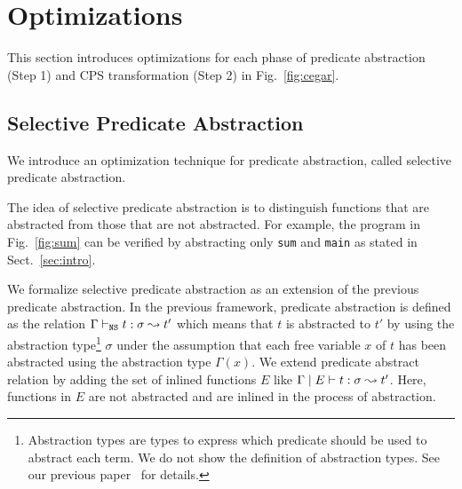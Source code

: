 
\section{Optimizations}
\label{sec:opt}

This section introduces optimizations for each phase of predicate
abstraction (Step 1) and CPS transformation (Step 2) in Fig.~\ref{fig:cegar}.

\subsection{Selective Predicate Abstraction}

We introduce an optimization technique for predicate abstraction, called
selective predicate abstraction.

The idea of selective predicate abstraction is to distinguish functions
that are abstracted from those that are not abstracted.  For
example, the program in Fig.~\ref{fig:sum} can be verified by
abstracting only \texttt{sum} and \texttt{main} as stated in
Sect.~\ref{sec:intro}.

We formalize selective predicate abstraction as an extension of the
previous predicate abstraction.  In the previous framework, predicate
abstraction is defined as the relation
${\Gamma} \vdash_{\texttt{NS}} {t} : {\sigma} \leadsto {t'}$ which means that $t$ is abstracted to $t'$
by using the abstraction type\footnote{Abstraction types are types to
express which predicate should be used to abstract each term.  We do not show
the definition of abstraction types.  See our previous
paper~\cite{KobayashiPLDI2011} for details.}  $\sigma$ under the
assumption that each free variable $x$ of $t$ has been abstracted using
the abstraction type $\Gamma(x)$.  We extend predicate abstract relation
by adding the set of inlined functions $E$ like
${\Gamma} \mid {E} \vdash {t} : {\sigma} \leadsto {t'}$.  Here, functions in $E$ are not
abstracted and are inlined in the process of abstraction.

